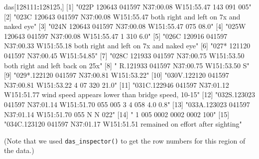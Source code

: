 \documentclass[
]{book}
\newenvironment{Shaded}{\begin{snugshade}}{\end{snugshade}}
\newcommand{\DecValTok}[1]{\textcolor[rgb]{0.00,0.00,0.81}{#1}}
\newcommand{\NormalTok}[1]{#1}
\newcommand{\OperatorTok}[1]{\textcolor[rgb]{0.81,0.36,0.00}{\textbf{#1}}}
\newcommand{\StringTok}[1]{\textcolor[rgb]{0.31,0.60,0.02}{#1}}
\begin{document}
\begin{Shaded}
\begin{Highlighting}[]
\NormalTok{das[}\DecValTok{128111}\OperatorTok{:}\DecValTok{128125}\NormalTok{,] }
\NormalTok{ [}\DecValTok{1}\NormalTok{] }\StringTok{"022P 120643 041597 N37:00.08 W151:55.47  143  091  005"}                                   
\NormalTok{ [}\DecValTok{2}\NormalTok{] }\StringTok{"023C 120643 041597 N37:00.08 W151:55.47 both right and left on 7x and naked eye"}          
\NormalTok{ [}\DecValTok{3}\NormalTok{] }\StringTok{"024N 120643 041597 N37:00.08 W151:55.47  075 08.0"}                                        
\NormalTok{ [}\DecValTok{4}\NormalTok{] }\StringTok{"025W 120643 041597 N37:00.08 W151:55.47    1            310  6.0"}                         
\NormalTok{ [}\DecValTok{5}\NormalTok{] }\StringTok{"026C 120916 041597 N37:00.33 W151:55.18 both right and left on 7x and naked eye"}          
\NormalTok{ [}\DecValTok{6}\NormalTok{] }\StringTok{"027* 121120 041597 N37:00.45 W151:54.85"}                                                  
\NormalTok{ [}\DecValTok{7}\NormalTok{] }\StringTok{"028C 121933 041597 N37:00.75 W151:53.50 both right and left back on 25x"}                  
\NormalTok{ [}\DecValTok{8}\NormalTok{] }\StringTok{"   R.121933 041597 N37:00.75 W151:53.50    S"}                                             
\NormalTok{ [}\DecValTok{9}\NormalTok{] }\StringTok{"029*.122120 041597 N37:00.81 W151:53.22"}                                                  
\NormalTok{[}\DecValTok{10}\NormalTok{] }\StringTok{"030V.122120 041597 N37:00.81 W151:53.22    4   07  320      21.0"}                         
\NormalTok{[}\DecValTok{11}\NormalTok{] }\StringTok{"031C.122946 041597 N37:01.12 W151:51.77 wind speed appears lower than bridge speed, 10-15"}
\NormalTok{[}\DecValTok{12}\NormalTok{] }\StringTok{"032S.123023 041597 N37:01.14 W151:51.70  055  005    3    4  058  4.0  0.8"}               
\NormalTok{[}\DecValTok{13}\NormalTok{] }\StringTok{"033A.123023 041597 N37:01.14 W151:51.70  055         N    N  022"}                         
\NormalTok{[}\DecValTok{14}\NormalTok{] }\StringTok{"   1                                     005 0002 0002 0002  100"}                         
\NormalTok{[}\DecValTok{15}\NormalTok{] }\StringTok{"034C.123120 041597 N37:01.17 W151:51.51  remained on effort after sighting"}               
\end{Highlighting}
\end{Shaded}

(Note that we used \texttt{das\_inspector()} to get the row numbers for this region of the data.)
\end{document}
